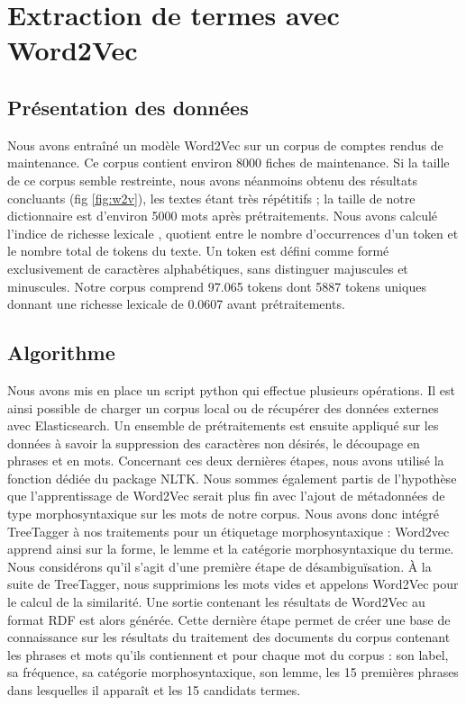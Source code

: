 \section{Extraction de termes avec Word2Vec}

\subsection{Présentation des données}
Nous avons entraîné un modèle Word2Vec sur un corpus de comptes rendus de maintenance. Ce corpus contient environ 8000 fiches de maintenance. Si la taille de ce corpus semble restreinte, nous avons néanmoins obtenu des résultats concluants (fig \ref{fig:w2v}), les textes étant très répétitifs ; la taille de notre dictionnaire est d'environ 5000 mots après prétraitements. Nous avons calculé l'indice de richesse lexicale \cite{McKee2000}, quotient entre le nombre d’occurrences d’un token et le nombre total de tokens du texte. Un token est défini comme formé exclusivement de caractères alphabétiques, sans distinguer majuscules et minuscules. Notre corpus comprend 97.065 tokens dont 5887 tokens uniques donnant une richesse lexicale de 0.0607 avant prétraitements.


\subsection{Algorithme}

Nous avons mis en place un script python qui effectue plusieurs opérations. Il est ainsi possible de charger un corpus local ou de récupérer des données externes avec Elasticsearch.
Un ensemble de prétraitements est ensuite appliqué sur les données à savoir la suppression des caractères non désirés, le découpage en phrases et en mots. Concernant ces deux dernières étapes, nous avons utilisé la fonction dédiée du package NLTK. Nous sommes également partis de l'hypothèse que l'apprentissage de Word2Vec serait plus fin avec l'ajout de métadonnées de type morphosyntaxique sur les mots de notre corpus. Nous avons donc intégré TreeTagger \cite{Schmid94probabilisticpart-of-speech} à nos traitements pour un étiquetage morphosyntaxique : Word2vec apprend ainsi sur la forme, le lemme et la catégorie morphosyntaxique du terme. Nous considérons qu'il s'agit d'une première étape de désambiguïsation. À la suite de TreeTagger, nous supprimions les mots vides et appelons Word2Vec pour le calcul de la similarité. Une sortie contenant les résultats de Word2Vec au format RDF est alors générée. Cette dernière étape permet de créer une base de connaissance sur les résultats du traitement des documents du corpus contenant les phrases et mots qu'ils contiennent et pour chaque mot du corpus : son label, sa fréquence, sa catégorie morphosyntaxique, son lemme, les 15 premières phrases dans lesquelles il apparaît et les 15 candidats termes.
